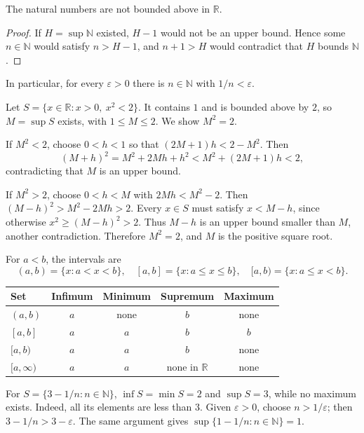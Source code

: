 \begin{theorem}\label{thm:analysis-archimedean}
The natural numbers are not bounded above in $\mathbb R$.
\end{theorem}
\begin{proof}
If $H=\sup\mathbb N$ existed, $H-1$ would not be an upper bound. Hence
some $n\in\mathbb N$ would satisfy $n>H-1$, and $n+1>H$ would contradict
that $H$ bounds $\mathbb N$.
\end{proof}
In particular, for every $\varepsilon>0$ there is $n\in\mathbb N$ with
$1/n<\varepsilon$.

\begin{example}
Let $S=\{x\in\mathbb R:x>0,\ x^2<2\}$. It contains $1$ and is bounded
above by $2$, so $M=\sup S$ exists, with $1\leq M\leq2$.
We show $M^2=2$.

If $M^2<2$, choose $0<h<1$ so that
$(2M+1)h<2-M^2$. Then
\[
(M+h)^2=M^2+2Mh+h^2<M^2+(2M+1)h<2,
\]
contradicting that $M$ is an upper bound.

If $M^2>2$, choose $0<h<M$ with $2Mh<M^2-2$. Then
$(M-h)^2>M^2-2Mh>2$. Every $x\in S$ must satisfy $x<M-h$, since otherwise
$x^2\geq(M-h)^2>2$. Thus $M-h$ is an upper bound smaller than $M$, another
contradiction. Therefore $M^2=2$, and $M$ is the positive square root.
\end{example}

\begin{example}
For $a<b$, the intervals are
\[
(a,b)=\{x:a<x<b\},\quad [a,b]=\{x:a\leq x\leq b\},\quad
[a,b)=\{x:a\leq x<b\}.
\]
\begin{center}
\begin{tabular}{lcccc}
\toprule
Set&Infimum&Minimum&Supremum&Maximum\\\midrule
$(a,b)$&$a$&none&$b$&none\\
$[a,b]$&$a$&$a$&$b$&$b$\\
$[a,b)$&$a$&$a$&$b$&none\\
$[a,\infty)$&$a$&$a$&none in $\mathbb R$&none\\\bottomrule
\end{tabular}
\end{center}
\end{example}

\begin{example}
For $S=\{3-1/n:n\in\mathbb N\}$, $\inf S=\min S=2$ and $\sup S=3$,
while no maximum exists. Indeed, all its elements are less than $3$.
Given $\varepsilon>0$, choose $n>1/\varepsilon$; then $3-1/n>3-\varepsilon$.
The same argument gives $\sup\{1-1/n:n\in\mathbb N\}=1$.
\end{example}

